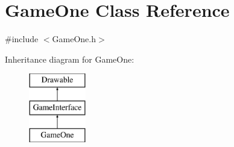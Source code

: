 \hypertarget{class_game_one}{}\section{Game\+One Class Reference}
\label{class_game_one}


{\ttfamily \#include $<$Game\+One.\+h$>$}

Inheritance diagram for Game\+One\+:\begin{figure}[H]
\begin{center}
\leavevmode
\includegraphics[height=3.000000cm]{class_game_one}
\end{center}
\end{figure}
